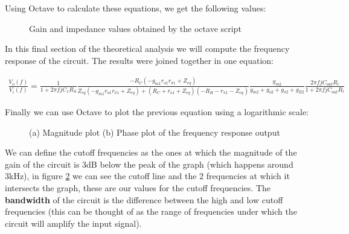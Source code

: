 Using Octave to calculate these equations, we get the following values:
\vspace{15pt}

\begin{figure}[h]
	\centering
	
	\caption{Gain and impedance values obtained by the octave script}
	\label{fig:results_th}
\end{figure}

\vspace{15pt}


\vspace{15pt}

In this final section of the theoretical analysis we will compute the frequency response of the circuit. The results were joined together in one equation:
\vspace{15pt}

\fontsize{8pt}{12pt}\selectfont
\begin{gather}
    	\frac{V_o(f)}{V_i(f)}=\frac{1}{1+2\pi fjC_1R_S}\frac{-R_C(-g_{m1}r_{o1}r_{\pi 1}+Z_{eq})}{Z_{eq}(-g_{m1}r_{o1}r_{\pi 1}+Z_{eq})+(R_C+r_{o1}+Z_{eq})(-R_B-r_{\pi 1}-Z_{eq})}\frac{g_{m2}}{g_{m2}+g_{o2}+g_{\pi 2}+g_{E2}}\frac{2\pi fjC_{out}R_l}{1+2\pi fjC_{out}R_l} \nonumber
\end{gather}
\normalsize
\pagebreak

Finally we can use Octave to plot the previous equation using a logarithmic scale:

\begin{figure}[h!]
	\centering
	\caption{(a) Magnitude plot (b) Phase plot of the frequency response output}
	\label{fig:freq_th}
\end{figure}

We can define the cutoff frequencies as the ones at which the magnitude of the gain of the circuit is 3dB below the peak of the graph (which happens around 3kHz), in figure \ref{fig:freq_th} we can see the cutoff line and the 2 frequencies at which it intersects the graph, these are our values for the cutoff frequencies. The \textbf{bandwidth} of the circuit is the difference between the high and low cutoff frequencies (this can be thought of as the range of frequencies under which the circuit will amplify the input signal).

